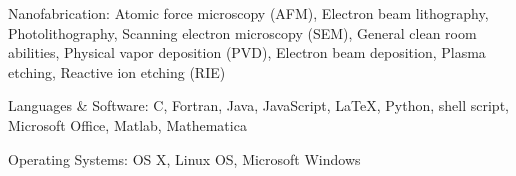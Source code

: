 \documentclass[10pt,letterpaper]{article}
\newenvironment{indentsection}[1]%
{\begin{list}{}%
	{\setlength{\leftmargin}{#1}}%
	\item[]%
}
{\end{list}}
\newcommand{\CPP}
{C\nolinebreak[4]\hspace{-.05em}\raisebox{.22ex}{\footnotesize\bf ++}}
\begin{document}
\begin{indentsection}{\parindent}
\begin{description*}
	\item[Nanofabrication:]
	Atomic force microscopy (AFM), Electron beam lithography, Photolithography, Scanning electron microscopy (SEM), General clean room abilities, Physical vapor deposition (PVD), Electron beam deposition, Plasma etching, Reactive ion etching (RIE)
	\item[Languages \& Software:]
	\CPP, Fortran, Java, JavaScript, \LaTeX, Python, shell script, Microsoft Office, Matlab, Mathematica
	\item[Operating Systems:]
	OS X, Linux OS, Microsoft Windows
\end{description*}
\end{indentsection}
\end{document}
